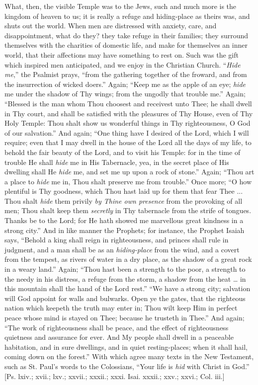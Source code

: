 What, then, the visible Temple was to the Jews, such and much more
is the kingdom of heaven to us; it is really a refuge and hiding-place
as theirs was, and shuts out the world. When men are distressed with
anxiety, care, and disappointment, what do they? they take refuge in
their families; they surround themselves with the charities of
domestic life, and make for themselves an inner world, that their
affections may have something to rest on. Such was the gift which
inspired men anticipated, and we enjoy in the Christian Church. ``\emph{Hide
me},'' the Psalmist prays, ``from the gathering together of the
froward, and from the insurrection of wicked doers.'' Again;
``Keep me as the apple of an eye; \emph{hide} me under the shadow
of Thy wings; from the ungodly that trouble me.'' Again;
``Blessed is the man whom Thou choosest and receivest unto Thee;
he shall dwell in Thy court, and shall be satisfied with the pleasures
of Thy House, even of Thy Holy Temple: Thou shalt show us wonderful
things in Thy righteousness, O God of our salvation.'' And again;
``One thing have I desired of the Lord, which I will require; even
that I may dwell in the house of the Lord all the days of my life, to
behold the fair beauty of the Lord, and to visit his Temple: for in
the time of trouble He shall \emph{hide} me in His Tabernacle, yea, in
the secret place of His dwelling shall He \emph{hide} me, and set me
up upon a rock of stone.'' Again; ``Thou art a place to \emph{hide}
me in, Thou shalt preserve me from trouble.'' Once more; ``O
how plentiful is Thy goodness, which Thou hast laid up for them that
fear Thee ... Thou shalt \emph{hide} them privily \emph{by Thine own
presence} from the provoking of all men; Thou shalt keep them \emph{secretly}
in Thy tabernacle from the strife of tongues. Thanks be to the Lord;
for He hath showed me marvellous great kindness in a strong
city.'' And in like manner the Prophets; for instance, the Prophet
Isaiah says, ``Behold a king shall reign in righteousness, and
princes shall rule in judgment, and a man shall be as an \emph{hiding-place}
from the wind, and a covert from the tempest, as rivers of water in a
dry place, as the shadow of a great rock in a weary land.'' Again;
``Thou hast been a strength to the poor, a strength to the needy
in his distress, a refuge from the storm, a shadow from the heat …
in this mountain shall the hand of the Lord rest.'' ``We have
a strong city; salvation will God appoint for walls and bulwarks. Open
ye the gates, that the righteous nation which keepeth the truth may
enter in; Thou wilt keep Him in perfect peace whose mind is stayed on
Thee; because he trusteth in Thee.'' And again; ``The work of
righteousness shall be peace, and the effect of righteousness
quietness and assurance for ever. And My people shall dwell in a
peaceable habitation, and in sure dwellings, and in quiet
resting-places; when it shall hail, coming down on the forest.''
With which agree many texts in the New Testament, such as St. Paul's
words to the Colossians, ``Your life is \emph{hid} with Christ in
God.'' [Ps. lxiv.; xvii.; lxv.; xxvii.; xxxii.; xxxi. Isai. xxxii.;
xxv.; xxvi.; Col. iii.]

